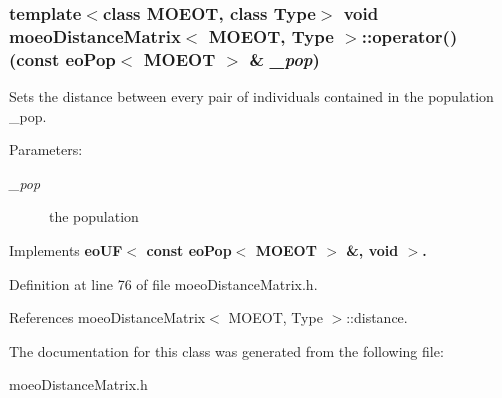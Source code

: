 \subsubsection{\setlength{\rightskip}{0pt plus 5cm}template$<$class MOEOT, class Type$>$ void \bf{moeo\-Distance\-Matrix}$<$ MOEOT, Type $>$::operator() (const \bf{eo\-Pop}$<$ MOEOT $>$ \& {\em \_\-pop})\hspace{0.3cm}{\tt  [inline, virtual]}}\label{classmoeoDistanceMatrix_ae3d433983a0a3d369cc17971498ad48}


Sets the distance between every pair of individuals contained in the population \_\-pop. 

\begin{Desc}
\item[Parameters:]
\begin{description}
\item[{\em \_\-pop}]the population \end{description}
\end{Desc}


Implements \bf{eo\-UF$<$ const eo\-Pop$<$ MOEOT $>$ \&, void $>$}.

Definition at line 76 of file moeo\-Distance\-Matrix.h.

References moeo\-Distance\-Matrix$<$ MOEOT, Type $>$::distance.

The documentation for this class was generated from the following file:\begin{CompactItemize}
\item 
moeo\-Distance\-Matrix.h\end{CompactItemize}
